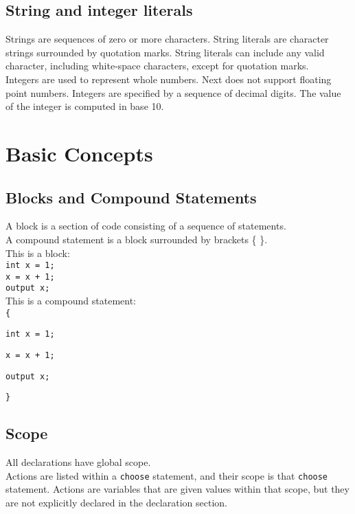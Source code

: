\documentclass[12pt]{article}
\begin{document}
\subsection{String and integer literals}
Strings are sequences of zero or more characters.  String literals are character strings surrounded by quotation marks.  String literals can include any valid character, including white-space characters, except for quotation marks. \\

\noindent Integers are used to represent whole numbers.  Next does not support floating point numbers.  Integers are specified by a sequence of decimal digits.  The value of the integer is computed in base 10.

\section{Basic Concepts}

\subsection{Blocks and Compound Statements}
A block is a section of code consisting of a sequence of statements.  \\ A compound statement is a block surrounded by brackets \{ \}. \\

\noindent This is a block: \\

\texttt{int x = 1;} \\
\indent \texttt{x = x + 1;} \\
\indent \texttt{output x;} \\

\noindent This is a compound statement: \\

\texttt{\{}

\indent \indent \texttt{int x = 1;}

\indent \indent \texttt{x = x + 1;}

\indent \indent \texttt{output x;} 

\texttt{\}}

\subsection{Scope}
All declarations have global scope.   \\

\noindent Actions are listed within a \texttt{choose} statement, and their scope is that \texttt{choose} statement.  Actions are variables that are given values within that scope, but they are not explicitly declared in the declaration section.
\end{document}
